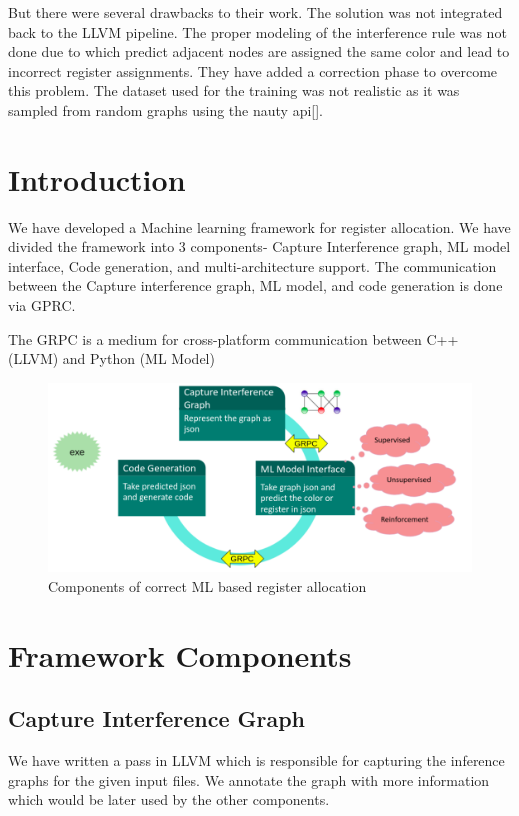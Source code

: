 But there were several drawbacks to their work. The solution was not integrated back to the LLVM pipeline. The proper modeling of the interference rule was not done due to which predict adjacent nodes are assigned the same color and lead to incorrect register assignments. They have added a correction phase to overcome this problem. The dataset used for the training was not realistic as it was sampled from random graphs using the nauty api[].

\section{Introduction}
We have developed a Machine learning framework for register allocation. We have divided the framework into 3 components- Capture Interference graph, ML model interface, Code generation, and multi-architecture support. The communication between the Capture interference graph, ML model, and code generation is done via GPRC.

The GRPC is a medium for cross-platform communication between C++ (LLVM) and Python (ML Model)

\begin{figure}[t]
    \centering
    \includegraphics[scale=0.4]{figures/chapter-5/mlra_components.png}
    \caption{Components of correct ML based register allocation}
     \label{fig:mlra-components}
\end{figure}

\section{Framework Components}
\subsection{Capture Interference Graph}
We have written a pass in LLVM which is responsible for capturing the inference graphs for the given input files. We annotate the graph with more information which would be later used by the other components.

